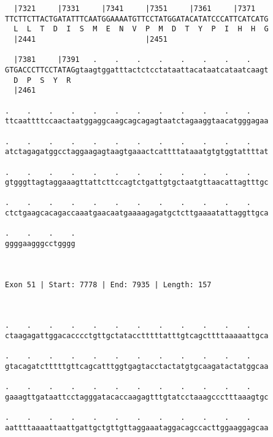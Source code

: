 \documentclass{article}
\begin{document}
\begin{Verbatim}
  |7321     |7331     |7341     |7351     |7361     |7371   
TTCTTCTTACTGATATTTCAATGGAAAATGTTCCTATGGATACATATCCCATTCATCATG
  L  L  T  D  I  S  M  E  N  V  P  M  D  T  Y  P  I  H  H  G
  |2441                         |2451                       
  
  |7381     |7391   .    .    .    .    .    .    .    .    
GTGACCCTTCCTATAGgtaagtggatttactctcctataattacataatcataatcaagt
  D  P  S  Y  R                                             
  |2461                                                     
  
.    .    .    .    .    .    .    .    .    .    .    .    
ttcaattttccaactaatggaggcaagcagcagagtaatctagaaggtaacatgggagaa
                                                            
.    .    .    .    .    .    .    .    .    .    .    .    
atctagagatggcctaggaagagtaagtgaaactcattttataaatgtgtggtattttat
                                                            
.    .    .    .    .    .    .    .    .    .    .    .    
gtgggttagtaggaaagttattcttccagtctgattgtgctaatgttaacattagtttgc
                                                            
.    .    .    .    .    .    .    .    .    .    .    .    
ctctgaagcacagaccaaatgaacaatgaaaagagatgctcttgaaaatattaggttgca
                                                            
.    .    .    .
ggggaagggcctgggg
                
                
 
Exon 51 | Start: 7778 | End: 7935 | Length: 157



.    .    .    .    .    .    .    .    .    .    .    .    
ctaagagattggacacccctgttgctatacctttttatttgtcagcttttaaaaattgca
                                                            
.    .    .    .    .    .    .    .    .    .    .    .    
gtacagatctttttgttcagcatttggtgagtacctactatgtgcaagatactatggcaa
                                                            
.    .    .    .    .    .    .    .    .    .    .    .    
gaaagttgataattcctagggatacaccaagagtttgtatcctaaagccctttaaagtgc
                                                            
.    .    .    .    .    .    .    .    .    .    .    .    
aattttaaaattaattgattgctgttgttaggaaataggacagccacttggaaggagcaa
                                                            

\end{Verbatim}
\end{document}
